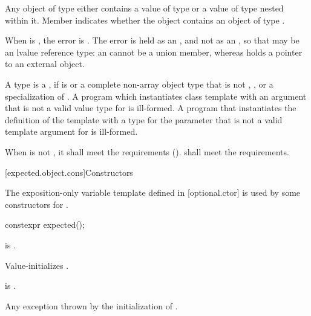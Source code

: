 \pnum
Any object of type  either
contains a value of type  or
a value of type 
nested within it.
Member  indicates whether the  object
contains an object of type .

\begin{addedblock}
\pnum
When  is , the error is
. The error is held as an ,
and not as an , so that  may be an lvalue reference type: an
 cannot be a union member, whereas  holds a
pointer to an external object.
\end{addedblock}

\pnum
A type  is a ,
if  is 
or a complete non-array object type that is not ,
,
or a specialization of .
A program which instantiates class template 
with an argument  that is not a valid value
type for  is ill-formed.
A program that instantiates
the definition of the template 
with a type for the  parameter
that is not a valid template argument for  is ill-formed.

\pnum
When  is not \cv{} , it shall meet
the  requirements ().
 shall meet
the  requirements.

[expected.object.cons]{Constructors}

\pnum
The exposition-only variable template 
defined in [optional.ctor]
is used by some constructors for .

%
\begin{itemdecl}
constexpr expected();
\end{itemdecl}

\begin{itemdescr}
\pnum
\constraints
{} is .

\pnum
\effects
Value-initializes .

\pnum
\ensures
{} is .

\pnum
\throws
Any exception thrown by the initialization of .
\end{itemdescr}

